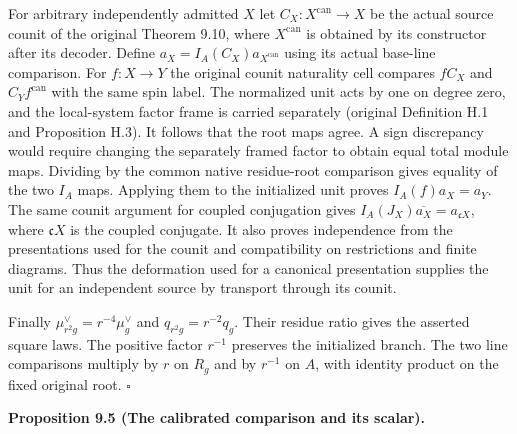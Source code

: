 \documentclass[
  english,
  11pt,
  reqno]{amsart}
\makeatletter
\newcommand{\pandocstatementheading}[1]{%
  \par\if@nobreak\else
    \addpenalty{\@beginparpenalty}%
    \addvspace{.5\baselineskip plus .2\baselineskip minus .2\baselineskip}%
  \fi
  {\normalfont\bfseries #1\par}%
  \nobreak\@afterindenttrue\@afterheading
}
\makeatother
\begin{document}
For arbitrary independently admitted \(X\) let
\(C_X:X^{\mathrm{can}}\to X\) be the actual source counit of the
original Theorem 9.10, where \(X^{\mathrm{can}}\) is obtained by its
constructor after its decoder. Define
\(a_X=I_A(C_X)a_{X^{\mathrm{can}}}\) using its actual base-line
comparison. For \(f:X\to Y\) the original counit naturality cell
compares \(f C_X\) and \(C_Y f^{\mathrm{can}}\) with the same spin
label. The normalized unit acts by one on degree zero, and the
local-system factor frame is carried separately (original Definition H.1
and Proposition H.3). It follows that the root maps agree. A sign
discrepancy would require changing the separately framed factor to
obtain equal total module maps. Dividing by the common native
residue-root comparison gives equality of the two \(I_A\) maps. Applying
them to the initialized unit proves \(I_A(f)a_X=a_Y\). The same counit
argument for coupled conjugation gives
\(I_A(J_X)\overline{a_X}=a_{\mathfrak c X}\), where \(\mathfrak c X\) is
the coupled conjugate. It also proves independence from the
presentations used for the counit and compatibility on restrictions and
finite diagrams. Thus the deformation used for a canonical presentation
supplies the unit for an independent source by transport through its
counit.

Finally \(\mu_{r^2g}^\vee=r^{-4}\mu_g^\vee\) and \(q_{r^2g}=r^{-2}q_g\).
Their residue ratio gives the asserted square laws. The positive factor
\(r^{-1}\) preserves the initialized branch. The two line comparisons
multiply by \(r\) on \(R_g\) and by \(r^{-1}\) on \(A\), with identity
product on the fixed original root. \hfill\(\square\)

\pandocstatementheading{\leavevmode{}\label{prop:analytic-scalar-one}Proposition 9.5 (The calibrated comparison and its scalar).}
\end{document}
